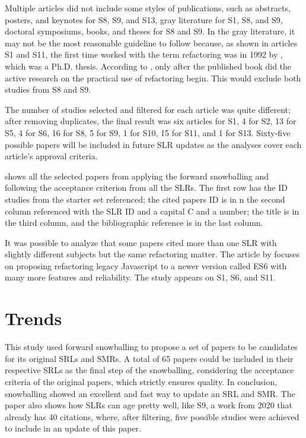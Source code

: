 Multiple articles did not include some styles of publications, such as abstracts, posters, and keynotes for S8, S9, and S13, gray literature for S1, S8, and S9, doctoral symposiums, books, and theses for S8 and S9. In the gray literature, it may not be the most reasonable guideline to follow because, as shown in articles S1 and S11, the first time worked with the term refactoring was in 1992 by \textcite{Opdyke1992}, which was a Ph.D. thesis. According to \textcite{Buriakovskyi2018}, only after the published book \textcite{fowler2018refactoring} did the active research on the practical use of refactoring begin. This would exclude both studies from S8 and S9.

The number of studies selected and filtered for each article was quite different; after removing duplicates, the final result was six articles for S1, 4 for S2, 13 for S5, 4 for S6, 16 for S8, 5 for S9, 1 for S10, 15 for S11, and 1 for S13. Sixty-five possible papers will be included in future SLR updates as the analyses cover each article's approval criteria.

  shows all the selected papers from applying the forward snowballing and following the acceptance criterion from all the SLRs. The first row has the ID studies from the starter set referenced; the cited papers ID is in n the second column referenced with the SLR ID and a capital C and a number; the title is in the third column, and the bibliographic reference is in the last column.



It was possible to analyze that some papers cited more than one SLR with slightly different subjects but the same refactoring matter. The article by \textcite{Paltoglou2021} focuses on proposing refactoring legacy Javascript to a newer version called ES6 with many more features and reliability. The study appears on S1, S6, and S11.


\section{Trends}
\label{sec-trends}
This study used forward snowballing to propose a set of papers to be candidates for its original SRLs and SMRs.
A total of 65 papers could be included in their respective SRLs as the final step of the snowballing, considering the acceptance criteria of the original papers, which strictly ensures quality. In conclusion, snowballing showed an excellent and fast way to update an SRL and SMR.
The paper also shows how SLRs can age pretty well, like S9, a work from 2020 that already has 40 citations, where, after filtering, five possible studies were achieved to include in an update of this paper.

